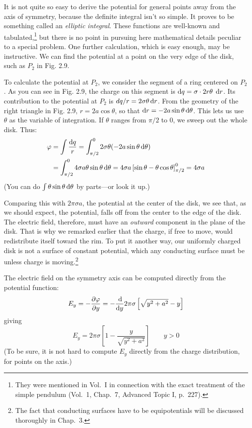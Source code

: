 It is not quite so easy to derive the potential for general points
away from the axis of symmetry, because the definite integral isn't so
simple. It proves to be something called an \emph{elliptic integral}. These
functions are well-known and 
tabulated,\footnote{They were mentioned in Vol.~I in connection with the exact treatment of the simple
pendulum (Vol.~1, Chap.~7, Advanced Topic I, p.~227).} but there is no point in
pursuing here mathematical details peculiar to a special problem.
One further calculation, which is easy enough, may be instructive.
We can find the potential at a point on the very edge of the disk, such
as $P_2$ in Fig. 2.9.

To calculate the potential at $P_2$, we consider the segment of a ring
centered on $P_2$. As you can see in Fig. 2.9, the charge on this segment
is $\operatorname{d\!} q = \sigma\cdot 2r\theta\;\operatorname{d\!} r$. Its contribution to the potential at $P_2$ is
$dq/r = 2\sigma\theta \operatorname{d\!} r$. From the geometry of the right triangle in Fig. 2.9,
$r = 2a \cos \theta$, so that $\operatorname{d\!} r = -2a \sin \theta \operatorname{d\!}\theta$. This lets us use $\theta$ as the
variable of integration. If $\theta$ ranges from $\pi/2$ to 0, we sweep out the
whole disk. Thus:
\begin{align}
\begin{split}
  \varphi &= \int \frac{\operatorname{d\!} q}{r} = \int_{\pi/2}^0 2\sigma\theta(-2a\sin\theta\operatorname{d\!}\theta) \\
       &= \int_{\pi/2}^0 4\sigma a \theta \sin\theta \operatorname{d\!}\theta
        = 4\sigma a\left[\sin\theta-\theta\cos\theta\right]_{\pi/2}^0 = 4\sigma a
\end{split}
\end{align}
(You can do $\int \theta \sin \theta \operatorname{d\!}\theta$ by parts---or look it up.)

Comparing this with $2\pi\sigma a$, the potential at the center of the disk,
we see that, as we should expect, the potential, falls off from the center
to the edge of the disk. The electric field, therefore, must have an
\emph{outward} component in the plane of the disk. That is why we remarked
earlier that the charge, if free to move, would redistribute
itself toward the rim. To put it another way, our uniformly charged
disk is not a surface of constant potential, which any conducting
surface must be unless charge is moving.\footnote{The fact that conducting
surfaces have to be equipotentials will be discussed
thoroughly in Chap.~3.}

The electric field on the symmetry axis can be computed directly
from the potential function:
\begin{equation}
  E_y = -\frac{\partial\varphi}{\partial y}
      = -\frac{\operatorname{d\!}}{\operatorname{d\!} y} 2\pi\sigma\left[\sqrt{y^2+a^2}-y\right]
\end{equation}
giving
\begin{equation}
  E_y =  2\pi\sigma\left[1-\frac{y}{\sqrt{y^2+a^2}}\right] \qquad y>0
\end{equation}
(To be sure, it is not hard to compute $E_y$ directly from the charge 
distribution, for points on the axis.)


